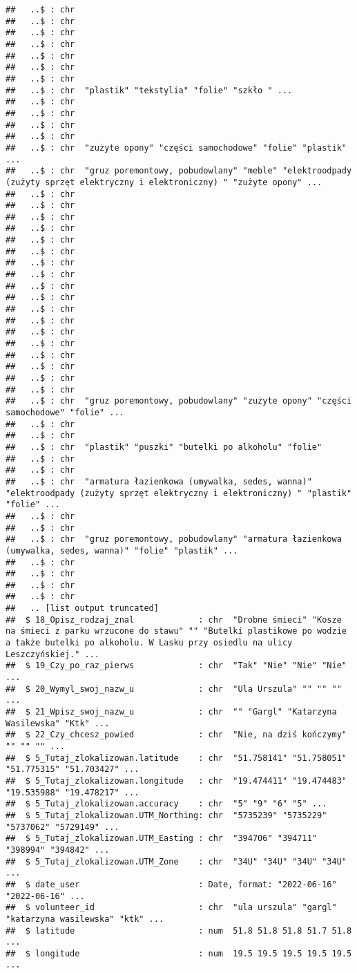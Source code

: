 \documentclass[
]{article}
\begin{document}
\begin{verbatim}
##   ..$ : chr 
##   ..$ : chr 
##   ..$ : chr 
##   ..$ : chr 
##   ..$ : chr 
##   ..$ : chr 
##   ..$ : chr 
##   ..$ : chr  "plastik" "tekstylia" "folie" "szkło " ...
##   ..$ : chr 
##   ..$ : chr 
##   ..$ : chr 
##   ..$ : chr 
##   ..$ : chr  "zużyte opony" "części samochodowe" "folie" "plastik" ...
##   ..$ : chr  "gruz poremontowy, pobudowlany" "meble" "elektroodpady (zużyty sprzęt elektryczny i elektroniczny) " "zużyte opony" ...
##   ..$ : chr 
##   ..$ : chr 
##   ..$ : chr 
##   ..$ : chr 
##   ..$ : chr 
##   ..$ : chr 
##   ..$ : chr 
##   ..$ : chr 
##   ..$ : chr 
##   ..$ : chr 
##   ..$ : chr 
##   ..$ : chr 
##   ..$ : chr 
##   ..$ : chr 
##   ..$ : chr 
##   ..$ : chr 
##   ..$ : chr 
##   ..$ : chr 
##   ..$ : chr  "gruz poremontowy, pobudowlany" "zużyte opony" "części samochodowe" "folie" ...
##   ..$ : chr 
##   ..$ : chr 
##   ..$ : chr  "plastik" "puszki" "butelki po alkoholu" "folie"
##   ..$ : chr 
##   ..$ : chr 
##   ..$ : chr  "armatura łazienkowa (umywalka, sedes, wanna)" "elektroodpady (zużyty sprzęt elektryczny i elektroniczny) " "plastik" "folie" ...
##   ..$ : chr 
##   ..$ : chr 
##   ..$ : chr  "gruz poremontowy, pobudowlany" "armatura łazienkowa (umywalka, sedes, wanna)" "folie" "plastik" ...
##   ..$ : chr 
##   ..$ : chr 
##   ..$ : chr 
##   ..$ : chr 
##   .. [list output truncated]
##  $ 18_Opisz_rodzaj_znal             : chr  "Drobne śmieci" "Kosze na śmieci z parku wrzucone do stawu" "" "Butelki plastikowe po wodzie a także butelki po alkoholu. W Lasku przy osiedlu na ulicy Leszczyńskiej." ...
##  $ 19_Czy_po_raz_pierws             : chr  "Tak" "Nie" "Nie" "Nie" ...
##  $ 20_Wymyl_swoj_nazw_u             : chr  "Ula Urszula" "" "" "" ...
##  $ 21_Wpisz_swoj_nazw_u             : chr  "" "Gargl" "Katarzyna Wasilewska" "Ktk" ...
##  $ 22_Czy_chcesz_powied             : chr  "Nie, na dziś kończymy" "" "" "" ...
##  $ 5_Tutaj_zlokalizowan.latitude    : chr  "51.758141" "51.758051" "51.775315" "51.703427" ...
##  $ 5_Tutaj_zlokalizowan.longitude   : chr  "19.474411" "19.474483" "19.535988" "19.478217" ...
##  $ 5_Tutaj_zlokalizowan.accuracy    : chr  "5" "9" "6" "5" ...
##  $ 5_Tutaj_zlokalizowan.UTM_Northing: chr  "5735239" "5735229" "5737062" "5729149" ...
##  $ 5_Tutaj_zlokalizowan.UTM_Easting : chr  "394706" "394711" "398994" "394842" ...
##  $ 5_Tutaj_zlokalizowan.UTM_Zone    : chr  "34U" "34U" "34U" "34U" ...
##  $ date_user                        : Date, format: "2022-06-16" "2022-06-16" ...
##  $ volunteer_id                     : chr  "ula urszula" "gargl" "katarzyna wasilewska" "ktk" ...
##  $ latitude                         : num  51.8 51.8 51.8 51.7 51.8 ...
##  $ longitude                        : num  19.5 19.5 19.5 19.5 19.5 ...
\end{verbatim}
\end{document}
